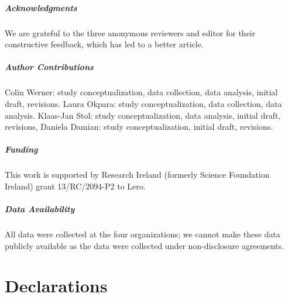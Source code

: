 \documentclass[smallextended]{svjour3}
\begin{document}








\footnotesize 
\subparagraph{Acknowledgments}
We are grateful to the three anonymous reviewers and editor for their constructive feedback, which has led to a better article. 

\subparagraph{Author Contributions}
Colin Werner: study conceptualization, data collection, data analysis, initial draft, revisions. Laura Okpara: study conceptualization, data collection, data analysis. Klaas-Jan Stol: study conceptualization, data analysis, initial draft, revisions, Daniela Damian: study conceptualization, initial draft, revisions. 

\subparagraph{Funding}
This work is supported by Research Ireland (formerly Science Foundation Ireland) grant 13/RC/2094-P2 to Lero.

\subparagraph{Data Availability}
All data were collected at the four organizations; we cannot make these data publicly available as the data were collected under non-disclosure agreements. 


\section*{Declarations}
\end{document}
